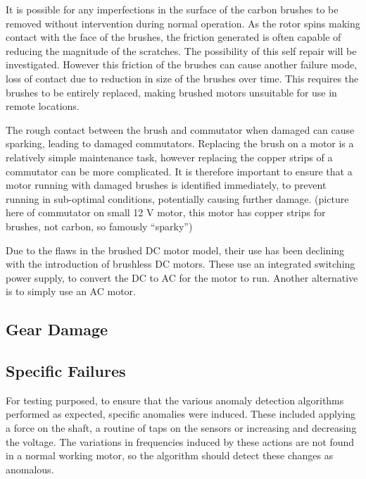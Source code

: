 It is possible for any imperfections in the surface of the carbon brushes to be removed without intervention during normal operation. As the rotor spins making contact with the face of the brushes, the friction generated is often capable of reducing the magnitude of the scratches. The possibility of this self repair will be investigated. However this friction of the brushes can cause another failure mode, loss of contact due to reduction in size of the brushes over time. This requires the brushes to be entirely replaced, making brushed motors unsuitable for use in remote locations. %

The rough contact between the brush and commutator when damaged can cause sparking, leading to damaged commutators. Replacing the brush on a motor is a relatively simple maintenance task, however replacing the copper strips of a commutator can be more complicated. It is therefore important to ensure that a motor running with damaged brushes is identified immediately, to prevent running in sub-optimal conditions, potentially causing further damage. (picture here of commutator on small 12 V motor, this motor has copper strips for brushes, not carbon, so famously “sparky”)

Due to the flaws in the brushed DC motor model, their use has been declining with the introduction of brushless DC motors. These use an integrated switching power supply, to convert the DC to AC for the motor to run. Another alternative is to simply use an AC motor. 

\subsection{Gear Damage}


\subsection{Specific Failures}

For testing purposed, to ensure that the various anomaly detection algorithms performed as expected, specific anomalies were induced. These included applying a force on the shaft, a routine of taps on the sensors or increasing and decreasing the voltage. The variations in frequencies induced by these actions are not found in a normal working motor, so the algorithm should detect these changes as anomalous. 


